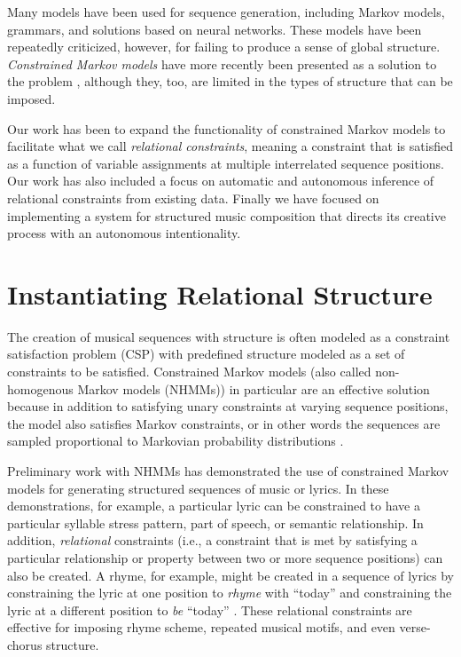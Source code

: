 \documentclass[letterpaper]{article}
\begin{document}
Many models have been used for sequence generation, including Markov models, grammars, and solutions based on neural networks. These models have been repeatedly criticized, however, for failing to produce a sense of global structure. \emph{Constrained Markov models} have more recently been presented as a solution to the problem \cite{pachet2011finite}, although they, too, are limited in the types of structure that can be imposed.

Our work has been to expand the functionality of constrained Markov models to facilitate what we call \emph{relational constraints}, meaning a constraint that is satisfied as a function of variable assignments at multiple interrelated sequence positions. Our work has also included a focus on automatic and autonomous inference of relational constraints from existing data. Finally we have focused on implementing a system for structured music composition that directs its creative process with an autonomous intentionality.

\section{Instantiating Relational Structure}

The creation of musical sequences with structure is often modeled as a constraint satisfaction problem (CSP) with predefined structure modeled as a set of constraints to be satisfied. Constrained Markov models (also called non-homogenous Markov models (NHMMs)) in particular are an effective solution because in addition to satisfying unary constraints at varying sequence positions, the model also satisfies Markov constraints, or in other words the sequences are sampled proportional to Markovian probability distributions \cite{pachet2011finite}.

Preliminary work with NHMMs has demonstrated the use of constrained Markov models for generating structured sequences of music or lyrics. In these demonstrations, for example, a particular lyric can be constrained to have a particular syllable stress pattern, part of speech, or semantic relationship. In addition, \emph{relational} constraints (i.e., a constraint that is met by satisfying a particular relationship or property between two or more sequence positions) can also be created. A rhyme, for example, might be created in a sequence of lyrics by constraining the lyric at one position to \emph{rhyme} with ``today'' and constraining the lyric at a different position to \emph{be} ``today'' \cite{barbieri2012markov}. These relational constraints are effective for imposing rhyme scheme, repeated musical motifs, and even verse-chorus structure.
\end{document}
